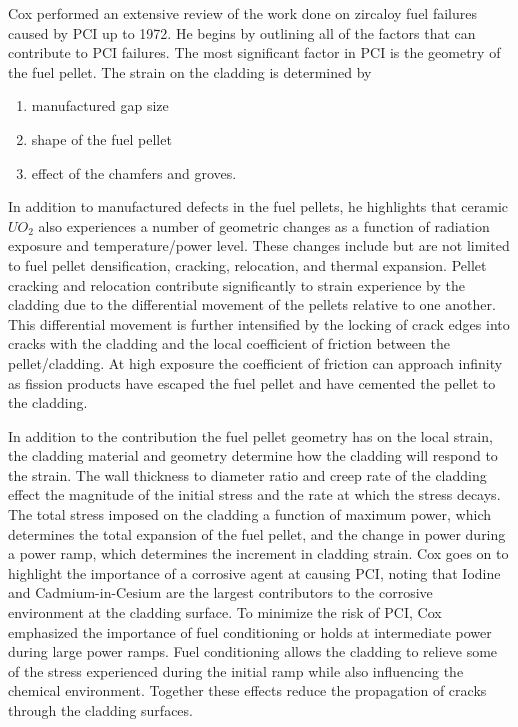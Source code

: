 \documentclass[edeposit,fullpage,12pt]{uiucthesis2009}
\begin{document}
Cox \cite{cox_pellet-clad_1990} performed an extensive review of the work done on zircaloy fuel failures caused by \gls{PCI} up to 1972.
He begins by outlining all of the factors that can contribute to \gls{PCI} failures.
The most significant factor in \gls{PCI} is the geometry of the fuel pellet. 
The strain on the cladding is determined by
\begin{enumerate}
\item manufactured gap size
\item shape of the fuel pellet
\item effect of the chamfers and groves.
\end{enumerate} 
In addition to manufactured defects in the fuel pellets, he highlights that ceramic $UO_2$ also experiences a number of geometric changes as a function of radiation exposure and temperature/power level.
These changes include but are not limited to fuel pellet  densification, cracking, relocation, and thermal expansion. 
Pellet cracking and relocation contribute significantly to strain experience by the cladding due to the differential movement of the pellets  relative to one another.
This differential movement is further intensified  by the locking of crack edges into cracks with the cladding and the local coefficient of friction between the pellet/cladding.
At high exposure the coefficient of friction can approach infinity as fission products have escaped the fuel pellet and have cemented the pellet to the cladding. 

In addition to the contribution the fuel pellet geometry has on the local strain, the cladding material and geometry determine how the cladding will respond to the strain.
The wall thickness to diameter ratio and creep rate of the cladding effect the magnitude of the initial stress and the rate at which the stress decays.
The total stress imposed on the cladding a function of maximum power, which determines the total expansion of the fuel pellet, and the change in power during a power ramp, which determines the increment in cladding strain.
Cox goes on to highlight the importance of a corrosive agent at causing \gls{PCI}, noting that Iodine and Cadmium-in-Cesium are the largest contributors to the corrosive environment at the cladding surface.
To minimize the risk of \gls{PCI}, Cox emphasized the importance of fuel conditioning or holds at intermediate power during large power ramps.
Fuel conditioning allows the cladding to relieve some of the stress experienced during the initial ramp while also influencing the chemical environment.
Together these effects reduce the propagation of cracks through the cladding surfaces.
\end{document}
